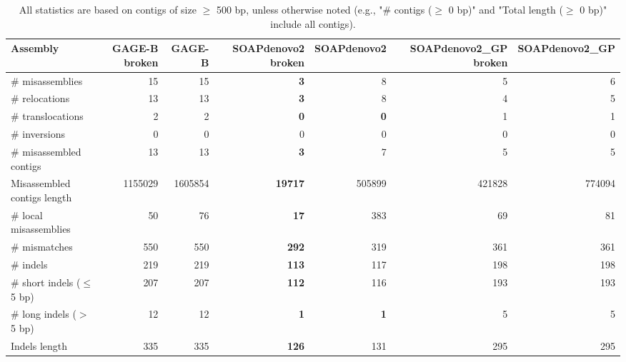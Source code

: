 \documentclass[12pt,a4paper]{article}
\begin{document}
\begin{table}[ht]
\begin{center}
\caption{All statistics are based on contigs of size $\geq$ 500 bp, unless otherwise noted (e.g., "\# contigs ($\geq$ 0 bp)" and "Total length ($\geq$ 0 bp)" include all contigs).}
\begin{tabular}{|l*{6}{|r}|}
\hline
Assembly & GAGE-B broken & GAGE-B & SOAPdenovo2 broken & SOAPdenovo2 & SOAPdenovo2\_GP broken & SOAPdenovo2\_GP \\ \hline
\# misassemblies & 15 & 15 & {\bf 3} & 8 & 5 & 6 \\ \hline
\hspace{5mm}\# relocations & 13 & 13 & {\bf 3} & 8 & 4 & 5 \\ \hline
\hspace{5mm}\# translocations & 2 & 2 & {\bf 0} & {\bf 0} & 1 & 1 \\ \hline
\hspace{5mm}\# inversions & 0 & 0 & 0 & 0 & 0 & 0 \\ \hline
\# misassembled contigs & 13 & 13 & {\bf 3} & 7 & 5 & 5 \\ \hline
Misassembled contigs length & 1155029 & 1605854 & {\bf 19717} & 505899 & 421828 & 774094 \\ \hline
\# local misassemblies & 50 & 76 & {\bf 17} & 383 & 69 & 81 \\ \hline
\# mismatches & 550 & 550 & {\bf 292} & 319 & 361 & 361 \\ \hline
\# indels & 219 & 219 & {\bf 113} & 117 & 198 & 198 \\ \hline
\hspace{5mm}\# short indels ($\leq$ 5 bp) & 207 & 207 & {\bf 112} & 116 & 193 & 193 \\ \hline
\hspace{5mm}\# long indels ($>$ 5 bp) & 12 & 12 & {\bf 1} & {\bf 1} & 5 & 5 \\ \hline
Indels length & 335 & 335 & {\bf 126} & 131 & 295 & 295 \\ \hline
\end{tabular}
\end{center}
\end{table}
\end{document}
